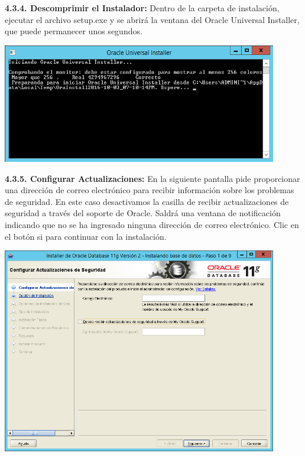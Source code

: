 \textbf {4.3.4. Descomprimir el Instalador:} Dentro de la carpeta de instalación, ejecutar el archivo setup.exe y se abrirá la ventana del  Oracle Universal Installer, que puede permanecer unos segundos.
\begin{center}
  \includegraphics[width=12cm]{Imagenes/Instalador_Universal.png}
\end{center}
\break

\textbf {4.3.5. Configurar Actualizaciones:} En la siguiente pantalla pide proporcionar una dirección de correo electrónico para recibir información sobre los problemas de seguridad.  En este caso desactivamos la casilla de recibir actualizaciones de seguridad a través del soporte de Oracle.  Saldrá una ventana de notificación indicando que no se ha ingresado ninguna dirección de correo electrónico.  Clic en el botón si para continuar con la instalación.
\begin{center}
  \includegraphics[width=12cm]{Imagenes/Configurar_Actualizaciones.png}
\end{center}

